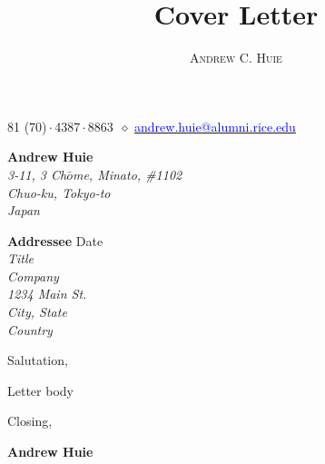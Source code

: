 \documentclass[10pt, a4paper]{article}
\makeatletter
\renewcommand{\maketitle}{
    \begin{center}
        {\Huge\theauthor}

        \vspace{0.25em}

        \raisebox{.3ex}{\footnotesize+}81 (70)\,$\cdot$\,4387\,$\cdot$\,8863~$\diamond$
        \href{mailto:andrew.huie@alumni.rice.edu}{\textcolor{blue}{
            andrew.huie@alumni.rice.edu
        }}

    \end{center}
}
\makeatother
\begin{document}
\title{Cover Letter}
\author{\textsc{Andrew C. Huie}}

\maketitle

\vspace{2em}

\begin{flushright}
    {\color{Gray}
    \textbf{Andrew Huie}\\
    \textsl{
        3-11, 3 Ch$\bar{o}$me, Minato, \#1102\\
        Chuo-ku, Tokyo-to\\
        Japan\\
    }}
\end{flushright}

\vspace{1em}

\textbf{Addressee} \hfill Date\\
\textsl{
    Title\\
    Company\\
    1234 Main St.\\
    City, State\\
    Country\\
}

Salutation,

Letter body

Closing,\\

\vspace{2em}

\textbf{Andrew Huie}
\end{document}
